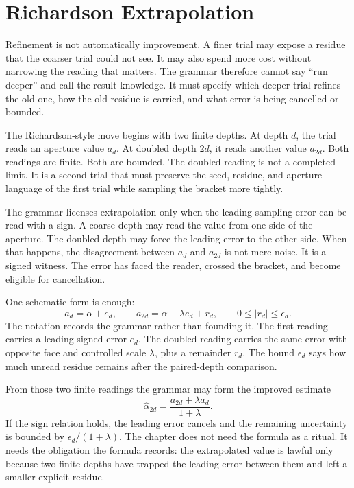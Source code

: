 \section{Richardson Extrapolation}

Refinement is not automatically improvement. A finer trial may expose a
residue that the coarser trial could not see. It may also spend more cost
without narrowing the reading that matters. The grammar therefore cannot say
``run deeper'' and call the result knowledge. It must specify which deeper
trial refines the old one, how the old residue is carried, and what error is
being cancelled or bounded.

The Richardson-style move begins with two finite depths. At depth \(d\), the
trial reads an aperture value \(a_d\). At doubled depth \(2d\), it reads
another value \(a_{2d}\). Both readings are finite. Both are bounded. The
doubled reading is not a completed limit. It is a second trial that must
preserve the seed, residue, and aperture language of the first trial while
sampling the bracket more tightly.

The grammar licenses extrapolation only when the leading sampling error can
be read with a sign. A coarse depth may read the value from one side of the
aperture. The doubled depth may force the leading error to the other side.
When that happens, the disagreement between \(a_d\) and \(a_{2d}\) is not
mere noise. It is a signed witness. The error has faced the reader, crossed
the bracket, and become eligible for cancellation.

One schematic form is enough:
\[
  a_d = \alpha + e_d,
  \qquad
  a_{2d} = \alpha - \lambda e_d + r_d,
  \qquad
  0 \leq |r_d| \leq \epsilon_d .
\]
The notation records the grammar rather than founding it. The first reading
carries a leading signed error \(e_d\). The doubled reading carries the same
error with opposite face and controlled scale \(\lambda\), plus a remainder
\(r_d\). The bound \(\epsilon_d\) says how much unread residue remains after
the paired-depth comparison.

From those two finite readings the grammar may form the improved estimate
\[
  \widehat{\alpha}_{2d}
    = \frac{a_{2d}+\lambda a_d}{1+\lambda}.
\]
If the sign relation holds, the leading error cancels and the remaining
uncertainty is bounded by \(\epsilon_d/(1+\lambda)\). The chapter does not
need the formula as a ritual. It needs the obligation the formula records:
the extrapolated value is lawful only because two finite depths have trapped
the leading error between them and left a smaller explicit residue.

